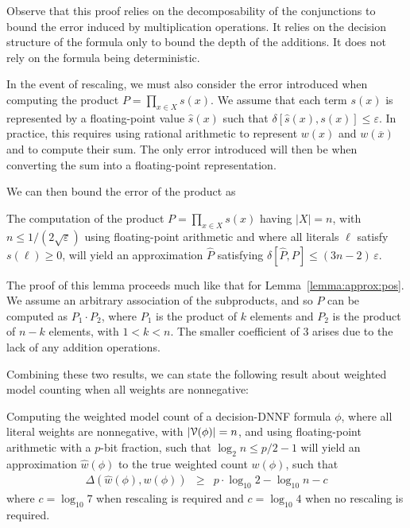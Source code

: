 \documentclass[letterpaper,USenglish,cleveref, autoref, thm-restate]{lipics-v2021}
\newcommand{\obar}[1]{\overline{#1}}
\newcommand{\lit}{\ell}
\newcommand{\approximate}[1]{\hat{#1}}
\newcommand{\approxP}{\approximate{P}}
\newcommand{\approxw}{\approximate{w}}
\newcommand{\approxs}{\approximate{s}}
\newcommand{\aerror}{\delta}
\newcommand{\digitprecision}{\Delta}
\newcommand{\roundepsilon}{\varepsilon}
\newcommand{\varset}{X}
\newcommand{\dependencyset}{{\cal V}}
\begin{document}
Observe that this proof relies on the decomposability of the
conjunctions to bound the error induced by multiplication operations.
It relies on the decision structure of the formula only to bound the
depth of the additions.  It does not rely on the formula being deterministic.

In the event of rescaling, we must also consider the error introduced
when computing the product $P = \prod_{x\in\varset} s(x)$.  We assume that
each term $s(x)$ is represented by a floating-point value
$\approxs(x)$ such that $\aerror[\approxs(x), s(x)] \leq
\roundepsilon$.  In practice, this requires using rational arithmetic
to represent $w(x)$ and $w(\obar{x})$ and to compute their sum.  The
only error introduced will then be when converting the sum into
a floating-point representation.

We can then bound the error of the product as
\begin{lemma}
  The computation of the product $P = \prod_{x\in\varset} s(x)$ having
$|\varset| = n$, with $n \leq 1/(2\sqrt{\roundepsilon})$ using floating-point arithmetic
and where all literals $\ell$ satisfy $s(\lit) \geq 0$,
will yield an approximation $\approxP$ satisfying
  $\aerror[\approxP, P] \leq (3n-2)\,\roundepsilon$.
  \label{lemma:approx:product}
\end{lemma}

The proof of this lemma proceeds much like that for Lemma~\ref{lemma:approx:pos}.  We assume an arbitrary association of the subproducts, and so $P$ can be computed as
$P_1 \cdot P_2$, where $P_1$ is the product of $k$ elements and $P_2$ is the product of $n-k$ elements, with $1 < k < n$.
The smaller coefficient of $3$ arises due to the lack of any addition operations.

Combining these two results, we can state the following result about weighted model counting when all weights are nonnegative:
\begin{theorem}
  \label{thm:approx:pos}
Computing the weighted model count of
a decision-DNNF formula $\phi$, where all literal weights are nonnegative, with $|\dependencyset(\phi)| = n$, and using floating-point arithmetic with a $p$-bit fraction, such that $\log_2 n \leq p/2-1$
will yield an approximation $\approxw(\phi)$ to the true weighted count $w(\phi)$, such that
\begin{eqnarray}
\digitprecision(\approxw(\phi), w(\phi)) & \geq & p \cdot \log_{10}2 - \log_{10}n - c\label{eqn:precision:wmc}
\end{eqnarray}
where $c = \log_{10} 7$ when rescaling is required and $c = \log_{10} 4$ when no rescaling is required.
\end{theorem}
\end{document}
